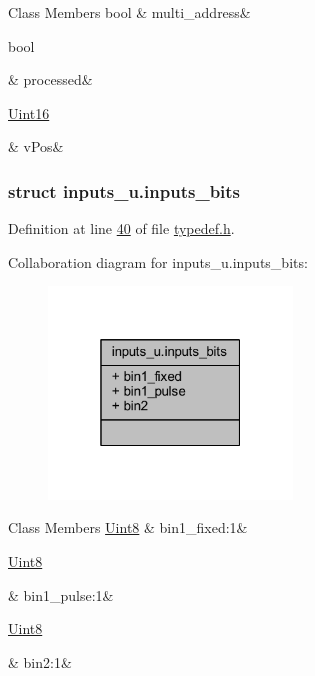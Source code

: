 \begin{DoxyFields}{Class Members}
\hypertarget{a00001_a8e69b971c61ced27a7567efd2bf0db59}{bool}\label{a00001_a8e69b971c61ced27a7567efd2bf0db59}
&
multi\+\_\+address&
\\
\hline

\hypertarget{a00001_a3e88f779da9798a5da7dda227e2ca388}{bool}\label{a00001_a3e88f779da9798a5da7dda227e2ca388}
&
processed&
\\
\hline

\hypertarget{a00001_a2b48b371fd84be2a8ad581b1ad708b88}{\hyperlink{a00001_aae7407b021d43f7193a81a58cfb3e297}{Uint16}}\label{a00001_a2b48b371fd84be2a8ad581b1ad708b88}
&
v\+Pos&
\\
\hline

\end{DoxyFields}
\label{d2/d1f/a00083}
\hypertarget{a00001_d2/d1f/a00083}{}
\subsubsection{struct inputs\+\_\+u.\+inputs\+\_\+bits}


Definition at line \hyperlink{a00001_source_l00040}{40} of file \hyperlink{a00001_source}{typedef.\+h}.



Collaboration diagram for inputs\+\_\+u.\+inputs\+\_\+bits\+:
\nopagebreak
\begin{figure}[H]
\begin{center}
\leavevmode
\includegraphics[width=184pt]{dd/dd7/a00248}
\end{center}
\end{figure}
\begin{DoxyFields}{Class Members}
\hypertarget{a00001_aba1fa70242d536bb4b33c09e88858eb5}{\hyperlink{a00001_a979e3e23b9a449e69ab6a8a83b6042f8}{Uint8}}\label{a00001_aba1fa70242d536bb4b33c09e88858eb5}
&
bin1\+\_\+fixed\+:1&
\\
\hline

\hypertarget{a00001_a773d1793979662c00676636ee9c6badf}{\hyperlink{a00001_a979e3e23b9a449e69ab6a8a83b6042f8}{Uint8}}\label{a00001_a773d1793979662c00676636ee9c6badf}
&
bin1\+\_\+pulse\+:1&
\\
\hline

\hypertarget{a00001_afe18431d7c0a68328e87a0281bbb4d75}{\hyperlink{a00001_a979e3e23b9a449e69ab6a8a83b6042f8}{Uint8}}\label{a00001_afe18431d7c0a68328e87a0281bbb4d75}
&
bin2\+:1&
\\
\hline

\end{DoxyFields}
\label{d3/d8b/a00059}
\hypertarget{a00001_d3/d8b/a00059}{}
